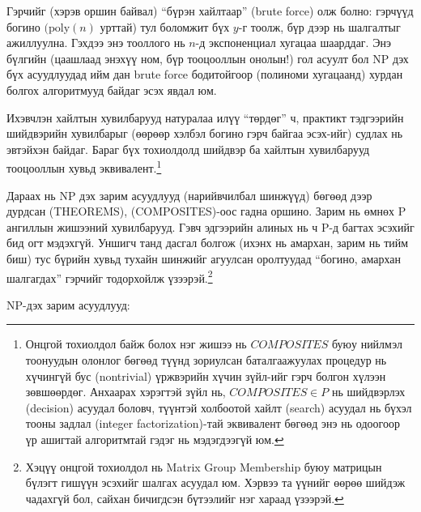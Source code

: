 Гэрчийг (хэрэв оршин байвал) “бүрэн хайлтаар” (brute force) олж болно: гэрчүүд богино $(\text{poly}(n)$ урттай) тул боломжит бүх $y$-г тоолж, бүр дээр нь шалгалтыг ажиллуулна. Гэхдээ энэ тооллого нь $n$-д экспоненциал хугацаа шаарддаг. Энэ бүлгийн (цаашлаад энэхүү ном, бүр тооцооллын онолын!) гол асуулт бол NP дэх бүх асуудлуудад ийм дан brute force бодитойгоор (полиноми хугацаанд) хурдан болгох алгоритмууд байдаг эсэх явдал юм.


Ихэвчлэн хайлтын хувилбарууд натуралаа илүү “төрдөг” ч, практикт тэдгээрийн шийдвэрийн хувилбарыг (өөрөөр хэлбэл богино гэрч байгаа эсэх-ийг) судлах нь эвтэйхэн байдаг. Бараг бүх тохиолдолд шийдвэр ба хайлтын хувилбарууд тооцооллын хувьд эквивалент.\footnote{Онцгой тохиолдол байж болох нэг жишээ нь $COMPOSITES$ буюу нийлмэл тоонуудын олонлог бөгөөд түүнд зориулсан баталгаажуулах процедур нь хүчингүй бус (nontrivial) үржвэрийн хүчин зүйл-ийг гэрч болгон хүлээн зөвшөөрдөг.
Анхаарах хэрэгтэй зүйл нь, $COMPOSITES \in P$ нь шийдвэрлэх (decision) асуудал боловч, түүнтэй холбоотой хайлт (search) асуудал нь бүхэл тооны задлал (integer factorization)-тай эквивалент бөгөөд энэ нь одоогоор үр ашигтай алгоритмтай гэдэг нь мэдэгдээгүй юм.}


Дараах нь NP дэх зарим асуудлууд (нарийвчилбал шинжүүд) бөгөөд дээр дурдсан (\textsc{THEOREMS}), (\textsc{COMPOSITES})-оос гадна оршино. Зарим нь өмнөх P ангиллын жишээний хувилбарууд. Гэвч эдгээрийн алиных нь ч P-д багтах эсэхийг бид огт мэдэхгүй. Уншигч танд дасгал болгож (ихэнх нь амархан, зарим нь тийм биш) тус бүрийн хувьд тухайн шинжийг агуулсан оролтуудад “богино, амархан шалгагдах” гэрчийг тодорхойлж үзээрэй.\footnote{Хэцүү онцгой тохиолдол нь Matrix Group Membership буюу матрицын бүлэгт гишүүн эсэхийг шалгах асуудал юм. Хэрвээ та үүнийг өөрөө шийдэж чадахгүй бол, сайхан бичигдсэн \cite{BS84} бүтээлийг нэг хараад үзээрэй.}


NP-дэх зарим асуудлууд:
\begin{itemize}
\end{itemize}
